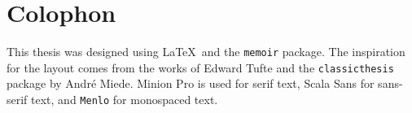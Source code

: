 \pagestyle{empty}
\hfill
\vfill
\section*{Colophon}
This thesis was designed using \LaTeX\ and the \texttt{memoir} package. The inspiration for the layout comes from the works of Edward Tufte and the \texttt{classicthesis} package by André Miede. Minion Pro is used for serif text, {\sffamily Scala Sans} for sans-serif text, and \texttt{Menlo} for monospaced text.
